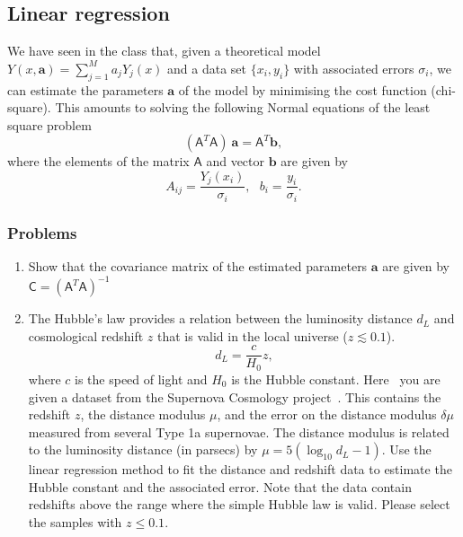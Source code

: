 \subsection{Linear regression}

We have seen in the class that, given a theoretical model $Y(x, \textbf{a}) = \sum_{j=1}^M a_j Y_j(x)$ and a data set $\{x_i, y_i\}$ with associated errors $\sigma_i$, we can estimate the parameters $\textbf{a}$ of the model by minimising the cost function (chi-square). This amounts to solving the following Normal equations of the least square problem 
\begin{equation} 
(\textsf{A}^T \textsf{A}) ~ \textbf{a} = \textsf{A}^T \textbf{b},
\end{equation} 
where the elements of the matrix $\textsf{A}$ and vector $\textbf{b}$ are given by 
\begin{equation} 
A_{ij} = \frac{Y_j(x_i)}{\sigma_i}, ~~~ b_i = \frac{y_i}{\sigma_i}. 
\end{equation} 

\subsubsection{Problems}

\begin{enumerate}
\item Show that the covariance matrix of the estimated parameters $\textbf{a}$ are given by $\textsf{C} = (\textsf{A}^T \textsf{A})^{-1}$

\item The Hubble's law provides a relation between the luminosity distance $d_L$ and cosmological redshift $z$ that is valid in the local universe ($z \lesssim 0.1$). 
\begin{equation} 
d_L = \frac{c}{H_0} z, 
\label{eq:Hubble_law}
\end{equation} 
where $c$ is the speed of light and $H_0$ is the Hubble constant. Here~\cite{sndata} you are given a dataset from the Supernova Cosmology project~\cite{SNCosmology}. This contains the redshift $z$, the distance modulus $\mu$, and the error on the distance modulus $\delta \mu$ measured from several Type 1a supernovae. The distance modulus is related to the luminosity distance (in parsecs) by $\mu = 5 \left(\log_{10} d_L - 1 \right)$. Use the linear regression method to fit the distance and redshift data to estimate the Hubble constant and the associated error. Note that the data contain redshifts above the range where the simple Hubble law is valid. Please select the samples with $z \leq 0.1$. 
\end{enumerate}

